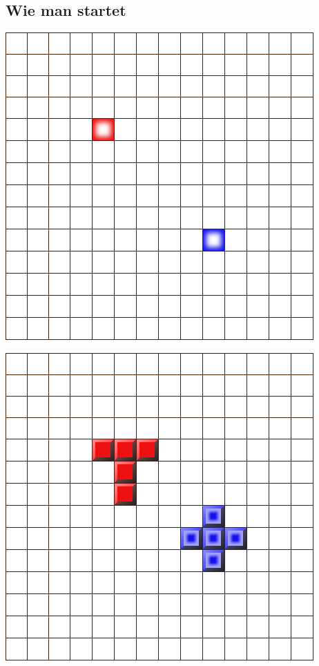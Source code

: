 \documentclass[12pt, draft]{beamer}
\begin{document}
\subsection{Wie man startet}
\begin{frame}
	\includegraphics[width=0.8\linewidth]{media/how2play0.png}
\end{frame}
\begin{frame}
	\includegraphics[width=0.8\linewidth]{media/how2play1.png}
\end{frame}
\end{document}
